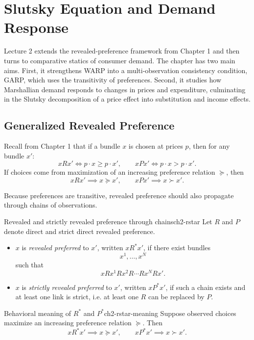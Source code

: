 
\section{Slutsky Equation and Demand Response}

Lecture 2 extends the revealed-preference framework from Chapter 1 and then turns to comparative statics of consumer demand. The chapter has two main aims. First, it strengthens WARP into a multi-observation consistency condition, GARP, which uses the transitivity of preferences. Second, it studies how Marshallian demand responds to changes in prices and expenditure, culminating in the Slutsky decomposition of a price effect into substitution and income effects.

\subsection{Generalized Revealed Preference}

Recall from Chapter 1 that if a bundle $x$ is chosen at prices $p$, then for any bundle $x'$:
\[
x R x' \iff p \cdot x \ge p \cdot x',
\qquad
x P x' \iff p \cdot x > p \cdot x'.
\]
If choices come from maximization of an increasing preference relation $\succeq$, then
\[
x R x' \implies x \succeq x',
\qquad
x P x' \implies x \succ x'.
\]

Because preferences are transitive, revealed preference should also propagate through chains of observations.

\begin{definition}{Revealed and strictly revealed preference through chains}{ch2-rstar}
Let $R$ and $P$ denote direct and strict direct revealed preference.

\begin{itemize}
    \item $x$ is \emph{revealed preferred} to $x'$, written $x R^* x'$, if there exist bundles
    \[
    x^1,\dots,x^N
    \]
    such that
    \[
    x R x^1 R x^2 R \cdots R x^N R x'.
    \]
    \item $x$ is \emph{strictly revealed preferred} to $x'$, written $x P^* x'$, if such a chain exists and at least one link is strict, i.e. at least one $R$ can be replaced by $P$.
\end{itemize}
\end{definition}

\begin{theorem}{Behavioral meaning of $R^*$ and $P^*$}{ch2-rstar-meaning}
Suppose observed choices maximize an increasing preference relation $\succeq$. Then
\[
x R^* x' \implies x \succeq x',
\qquad
x P^* x' \implies x \succ x'.
\]
\end{theorem}

